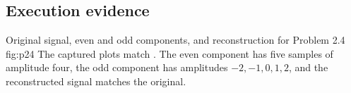 \subsection{Execution evidence}
  {Original signal, even and odd components, and reconstruction for Problem 2.4}
  {fig:p24}
The captured plots match . The even component has five
samples of amplitude four, the odd component has amplitudes
$-2,-1,0,1,2$, and the reconstructed signal matches the original.
